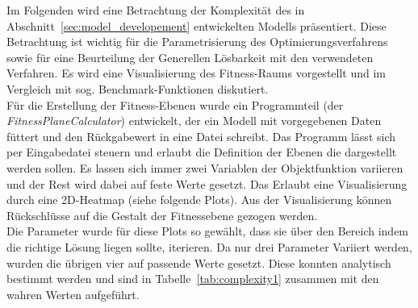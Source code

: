 %
Im Folgenden wird eine Betrachtung der Komplexität des in Abschnitt~\ref{sec:model_developement} entwickelten Modells präsentiert. Diese Betrachtung ist wichtig für die Parametrisierung des Optimierungsverfahrens sowie für eine Beurteilung der Generellen Lösbarkeit mit den verwendeten Verfahren. Es wird eine Visualisierung des Fitness-Raums vorgestellt und im Vergleich mit sog. Benchmark-Funktionen diskutiert.\\
%

Für die Erstellung der Fitness-Ebenen wurde ein Programmteil (der \textit{FitnessPlaneCalculator}) entwickelt, der ein Modell mit vorgegebenen Daten füttert und den Rückgabewert in eine Datei schreibt. Das Programm lässt sich per Eingabedatei steuern und erlaubt die Definition der Ebenen die dargestellt werden sollen. Es lassen sich immer zwei Variablen der Objektfunktion variieren und der Rest wird dabei auf feste Werte gesetzt. Das Erlaubt eine Visualisierung durch eine 2D-Heatmap (siehe folgende Plots). Aus der Visualisierung können Rückschlüsse auf die Gestalt der Fitnessebene gezogen werden.\\
%

Die Parameter wurde für diese Plots so gewählt, dass sie über den Bereich indem die richtige Lösung liegen sollte, iterieren. Da nur drei Parameter Variiert werden, wurden die übrigen vier auf passende Werte gesetzt. Diese konnten analytisch bestimmt werden und sind in Tabelle~\ref{tab:complexity1} zusammen mit den wahren Werten aufgeführt.\\

